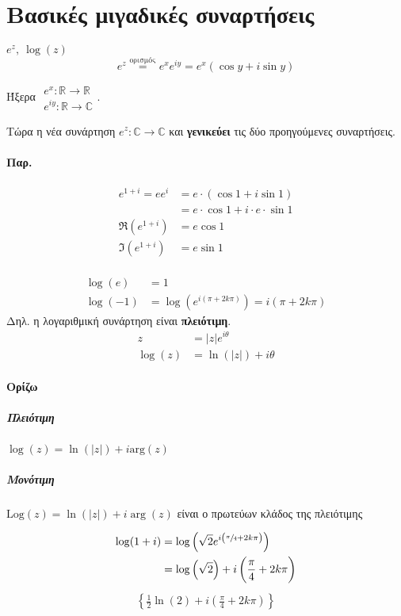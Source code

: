 \documentclass[12pt,a4paper,titlepage,fleqn]{article}
\begin{document}
    \section{Βασικές μιγαδικές συναρτήσεις}
    \( e^z,\ \log(z) \)
    \[
    e^z \overset{\text{ορισμός}}{=} e^xe^{iy}
    = e^x(\cos y+i\sin y)
    \]

    Ήξερα \( \begin{array}{l}
    e^x: \mathbb R \to \mathbb R  \\
    e^{iy}: \mathbb R \to \mathbb C
    \end{array} \).

    Τώρα η νέα συνάρτηση \( e^z: \mathbb C \to \mathbb C \) και \textbf{γενικεύει}
    τις δύο προηγούμενες συναρτήσεις.

    \paragraph{Παρ.}
    \begin{align*}
    e^{1+i}= ee^i &= e\cdot(\cos 1+i\sin 1) \\ &= e\cdot\cos1+i\cdot e\cdot \sin 1
    \\ \Re\left(e^{1+i}\right) &= e\cos1
    \\ \Im\left(e^{1+i}\right) &= e\sin1
    \end{align*}

    \paragraph{}
    \begin{align*}
    \log(e) &= 1 \\
    \log(-1) &= \log\left(e^{i(\pi+2k\pi)} \right) = i(\pi+2k\pi)
    \end{align*}
    Δηλ. η λογαριθμική συνάρτηση είναι \textbf{πλειότιμη}.
    \begin{align*}
    z &= |z|e^{i\theta} \\
    \log(z) &= \ln\left(|z|\right)+i\theta
    \end{align*}

    \paragraph{Ορίζω}
    \subparagraph{Πλειότιμη} \( \log(z) = \ln\left(|z|\right)+i\mathrm{arg}(z) \)
    \subparagraph{Μονότιμη} \( \mathrm{Log}(z) = \ln\left(|z|\right)+i\arg(z)\)
    είναι ο πρωτεύων κλάδος της πλειότιμης

    \begin{align*}
    \log(1+i) &= \log\left(
        \sqrt{2}e^{i\left(\sfrac{\pi}{4}+2k\pi \right)}
    \right) \\ &=
    \log\left(\sqrt{2}\right) + i\left( \frac{\pi}{4} +2k\pi \right)
    \end{align*}
    \begin{align*}
    \left\lbrace
    \frac{1}{2}\ln(2) + i\left( \frac{\pi}{4} +2 k \pi \right)
     \right\rbrace
    \end{align*}
\end{document}
